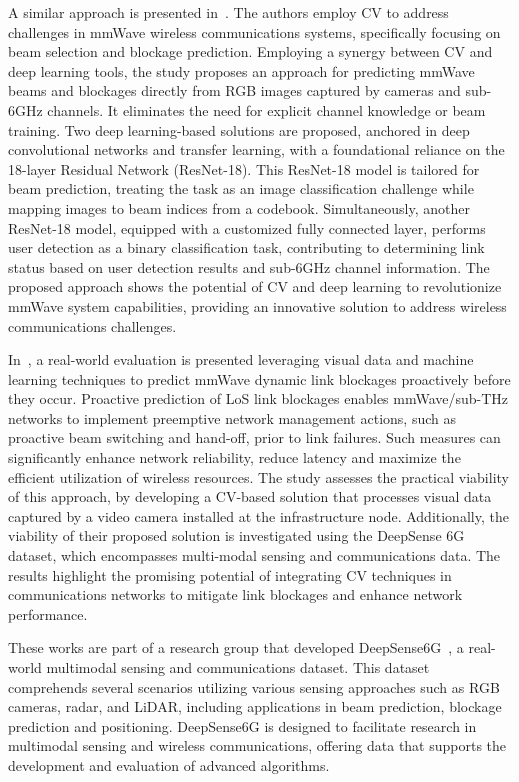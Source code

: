 A similar approach is presented in~\cite{Block_predict2}.
The authors employ CV to address challenges in mmWave wireless communications systems, specifically focusing on beam selection and blockage prediction.
Employing a synergy between CV and deep learning tools, the study proposes an approach for predicting mmWave beams and blockages directly from RGB images captured by cameras and sub-6GHz channels.
It eliminates the need for explicit channel knowledge or beam training.
Two deep learning-based solutions are proposed, anchored in deep convolutional networks and transfer learning, with a foundational reliance on the 18-layer Residual Network (ResNet-18).
This ResNet-18 model is tailored for beam prediction, treating the task as an image classification challenge while mapping images to beam indices from a codebook.
Simultaneously, another ResNet-18 model, equipped with a customized fully connected layer, performs user detection as a binary classification task, contributing to determining link status based on user detection results and sub-6GHz channel information.
The proposed approach shows the potential of CV and deep learning to revolutionize mmWave system capabilities, providing an innovative solution to address wireless communications challenges.

In~\cite{CVAided}, a real-world evaluation is presented leveraging visual data and machine learning techniques to predict mmWave dynamic link blockages proactively before they occur.
Proactive prediction of LoS link blockages enables mmWave/sub-THz networks to implement preemptive network management actions, such as proactive beam switching and hand-off, prior to link failures.
Such measures can significantly enhance network reliability, reduce latency and maximize the efficient utilization of wireless resources.
The study assesses the practical viability of this approach, by developing a CV-based solution that processes visual data captured by a video camera installed at the infrastructure node.
Additionally, the viability of their proposed solution is investigated using the DeepSense 6G~\cite{deepsense} dataset, which encompasses multi-modal sensing and communications data.
The results highlight the promising potential of integrating CV techniques in communications networks to mitigate link blockages and enhance network performance.

These works are part of a research group that developed DeepSense6G~\cite{deepsense}, a real-world multimodal sensing and communications dataset.
This dataset comprehends several scenarios utilizing various sensing approaches such as RGB cameras, radar, and LiDAR, including applications in beam prediction, blockage prediction and positioning.
DeepSense6G is designed to facilitate research in multimodal sensing and wireless communications, offering data that supports the development and evaluation of advanced algorithms.



